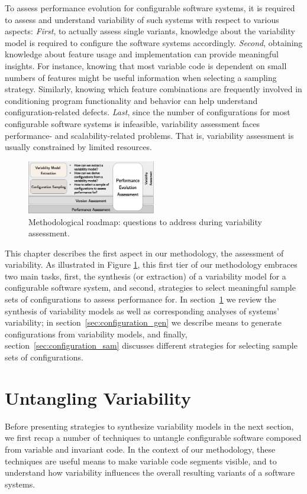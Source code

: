 To assess performance evolution for configurable software systems, it is
required to assess and understand variability of such systems with respect to
various aspects: \emph{First}, to actually assess single variants, knowledge
about the variability model is required to configure the software systems accordingly.
\emph{Second}, obtaining knowledge about feature usage and implementation can
provide meaningful insights. For instance, knowing that most variable code is dependent
on small numbers of features might be useful information when selecting a
sampling strategy. Similarly, knowing which feature combinations are frequently
involved in conditioning program functionality and behavior can help understand
configuration-related defects. \emph{Last}, since the number of configurations
for most configurable software systems is infeasible, variability assessment faces
performance- and scalability-related problems. That is, variability assessment
is usually constrained by limited resources.

\begin{figure}[h!]
	\centering
	\includegraphics[width=0.5\textwidth]{images/process_varassesment.eps}
	\caption{Methodological roadmap: questions to address during variability
	assessment.}
	\label{fig:roadmap_1}
\end{figure}
 
This chapter describes the first aspect in our methodology, the assessment of
variability. As illustrated in Figure \ref{fig:roadmap_1}, this first tier of
our methodology embraces two main tasks, first, the synthesis (or extraction) of a variability model for a configurable software system, and second, strategies to select
meaningful sample sets of configurations to assess performance for. In
section~\ref{sec:untangling} we review the synthesis of variability models as
well as corresponding analyses of systems’ variability; in
section~\ref{sec:configuration_gen} we describe means to generate configurations from variability models, and finally,
section~\ref{sec:configuration_sam} discusses different strategies for selecting
sample sets of configurations.

\section{Untangling Variability}\label{sec:untangling}
Before presenting strategies to synthesize variability models in
the next section, we first recap a number of techniques to untangle configurable
software composed from variable and invariant code. In the context of our
methodology, these techniques are useful means to make variable code segments
visible, and to understand how variability influences the overall resulting
variants of a software systems.

